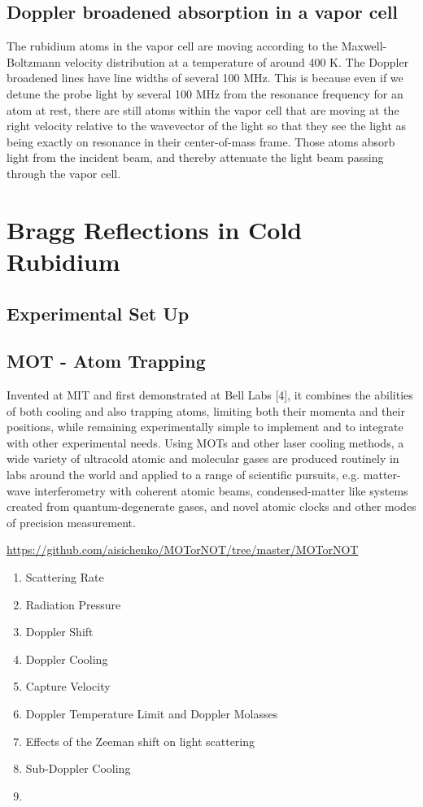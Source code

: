 \documentclass[10pt]{article}
\begin{document}
\subsection*{Doppler broadened absorption in a vapor cell}
The rubidium atoms in the vapor cell are moving according to the Maxwell-Boltzmann velocity distribution at a temperature of around 400 K. The Doppler broadened lines have line widths of several 100 MHz. This is because even if we detune the probe light by several 100 MHz from the resonance frequency for an atom at rest, there are still atoms within the vapor cell that are moving at the right velocity relative to the wavevector of the light so that they see the light as being exactly on resonance in their center-of-mass frame. Those atoms absorb light from the incident beam, and thereby attenuate the light beam passing through the vapor cell.

\section*{Bragg Reflections in Cold Rubidium}




\subsection*{Experimental Set Up}


\subsection*{MOT - Atom Trapping}
Invented at MIT and first demonstrated at Bell Labs [4], it combines the abilities of both cooling and also trapping atoms, limiting both their momenta and their positions, while remaining experimentally simple to implement and to integrate with other experimental needs. Using MOTs and other laser cooling methods, a wide variety of ultracold atomic and molecular gases are produced routinely in labs around the world and applied to a range of scientific pursuits, e.g. matter-wave interferometry with coherent atomic beams, condensed-matter like systems created from quantum-degenerate gases, and novel atomic clocks and other modes of precision measurement.

\url{https://github.com/aisichenko/MOTorNOT/tree/master/MOTorNOT}


\begin{enumerate}
    \item Scattering Rate
    \item Radiation Pressure
    \item Doppler Shift
    \item Doppler Cooling
    \item Capture Velocity
    \item Doppler Temperature Limit and Doppler Molasses
    \item Effects of the Zeeman shift on light scattering
    \item Sub-Doppler Cooling
    \item 
\end{enumerate}
\end{document}
